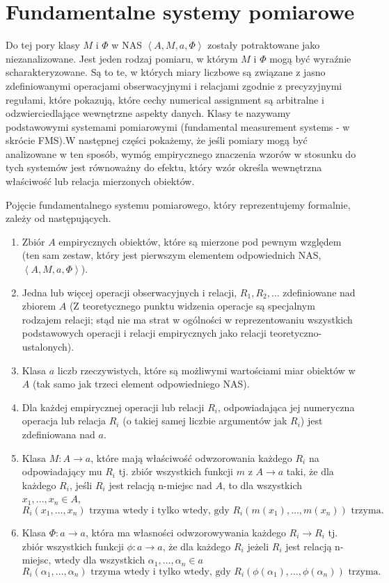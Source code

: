 \documentclass[12pt,a4paper]{report}
\newcommand{\tuple}[1]{\left\langle {#1} \right\rangle}
\begin{document}
\section{Fundamentalne systemy pomiarowe}

Do tej pory klasy $M$ i $\Phi$ w NAS $\tuple{A,M,a,\Phi}$ zostały potraktowane jako niezanalizowane. Jest jeden rodzaj pomiaru, w którym $M$ i $\Phi$ mogą być wyraźnie scharakteryzowane. Są to te, w których miary liczbowe są związane z jasno zdefiniowanymi operacjami obserwacyjnymi i relacjami zgodnie z precyzyjnymi regułami, które pokazują, które cechy numerical assignment są arbitralne i odzwierciedlające wewnętrzne aspekty danych. Klasy te nazywamy podstawowymi systemami pomiarowymi (fundamental measurement systems - w skrócie FMS).W następnej części pokażemy, że jeśli pomiary mogą być analizowane w ten sposób, wymóg empirycznego znaczenia wzorów w stosunku do tych systemów jest równoważny do efektu, który wzór określa wewnętrzna właściwość lub relacja mierzonych obiektów.

Pojęcie fundamentalnego systemu pomiarowego, który reprezentujemy formalnie, zależy od następujących.
\begin{enumerate}
\item
Zbiór $A$ empirycznych obiektów, które są mierzone pod pewnym względem (ten sam zestaw, który jest pierwszym elementem odpowiednich NAS, $\tuple{A,M,a,\Phi}$).
\item
Jedna lub więcej operacji obserwacyjnych i relacji, $R_{1},R_{2},\dots$ zdefiniowane nad zbiorem $A$ (Z teoretycznego punktu widzenia operacje są
specjalnym rodzajem relacji; stąd nie ma strat w ogólności w reprezentowaniu wszystkich podstawowych operacji i relacji empirycznych jako relacji teoretyczno-ustalonych).
\item
Klasa $a$ liczb rzeczywistych, które są możliwymi wartościami miar obiektów w $A$ (tak samo jak trzeci element odpowiedniego NAS).
\item
Dla każdej empirycznej operacji lub relacji $R_{i}$, odpowiadająca jej numeryczna operacja lub relacja $R_{i}$ (o takiej samej liczbie argumentów jak $R_{i}$) jest zdefiniowana nad $a$.
\item
Klasa $M:A\to a$, które mają właściwość odwzorowania każdego $R_{i}$ na odpowiadający mu $R_{i}$ tj. zbiór wszystkich funkcji $m$ z $A\to a$ taki, że dla każdego $R_{i}$, jeśli $R_{i}$ jest relacją n-miejsc nad $A$, to dla wszystkich $x_{1},\dots, x_{n} \in A$,
\begin{equation*}
R_{i}(x_{1},\dots,x_{n}) \textrm{ trzyma wtedy i tylko wtedy, gdy } R_{i}(m(x_{1}),\dots,m(x_{n})) \textrm{ trzyma}.
\end{equation*}
\item
Klasa $\Phi:a\to a$, która ma własności odwzorowywania każdego $R_{i} \to R_{i}$ tj. zbiór wszystkich funkcji $\phi: a \to a$, że dla każdego $R_{i}$ jeżeli $R_{i}$ jest relacją n-miejsc, wtedy dla wszystkich $\alpha_{1},\dots,\alpha_{n}\in a$
\begin{equation*}
R_{i}(\alpha_{1},\dots,\alpha_{n}) \textrm{ trzyma wtedy i tylko wtedy, gdy } R_{i}(\phi(\alpha_{1}),\dots,\phi(\alpha_{n})) \textrm{ trzyma}.
\end{equation*} 
\end{enumerate}
\end{document}
